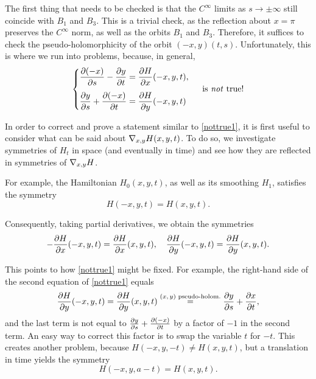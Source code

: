 The first thing that needs to be checked is that the $C^\infty$ limits as $s \to \pm \infty$ still coincide with $B_1$ and $B_3$. This is a trivial check, as the reflection about $x = \pi$ preserves the $C^\infty$ norm, as well as the orbits $B_1$ and $B_3$. Therefore, it suffices to check the pseudo-holomorphicity of the orbit $(-x,y)(t,s)$. Unfortunately, this is where we run into problems, because, in general,
\begin{equation}
\label{nottrue1}
\begin{cases}
\displaystyle \diffp{(-x)} s - \diffp y t = \diffp H x(-x,y,t),\\[1em]
\displaystyle \diffp y s + \diffp{(-x)} t = \diffp H y(-x,y,t)
\end{cases}
\text{ is \emph{not} true!}
\end{equation}

In order to correct and prove a statement similar to \eqref{nottrue1}, it is first useful to consider what can be said about $\nabla_{x,y} H(x,y,t)$. To do so, we investigate symmetries of $H_t$ in space (and eventually in time) and see how they are reflected in symmetries of $\nabla_{x,y} H$.

For example, the Hamiltonian $H_0(x,y,t)$, as well as its smoothing $H_1$, satisfies the symmetry
\begin{equation}
H(-x,y,t) = H(x,y,t).
\end{equation}

Consequently, taking partial derivatives, we obtain the symmetries
\begin{equation}\label{eq:symmetries1}
- \diffp H x(-x,y,t) = \diffp H x(x,y,t),\quad \diffp H y(-x,y,t) = \diffp H y (x,y,t).
\end{equation}

This points to how \eqref{nottrue1} might be fixed. For example, the right-hand side of the second equation of \eqref{nottrue1} equals
\begin{equation}
\diffp H y (-x,y,t) = \diffp H y (x,y,t) \stackrel{\text{$(x,y)$ pseudo-holom.}}{=} \diffp y s + \diffp{x} t,
\end{equation}
and the last term is not equal to $\diffp y s + \diffp{(-x)} t$ by a factor of $-1$ in the second term. An easy way to correct this factor is to swap the variable $t$ for $-t$. This creates another problem, because $H(-x,y,-t) \neq H(x,y,t)$, but a translation in time yields the symmetry
\begin{equation}
H(-x,y,a - t) = H(x,y,t).
\end{equation}

